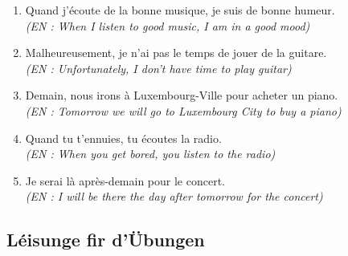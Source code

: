 \begin{enumerate}
    \item Quand j'écoute de la bonne musique, je suis de bonne humeur. \\
    \small\textit{(EN : When I listen to good music, I am in a good mood)}
    \item Malheureusement, je n'ai pas le temps de jouer de la guitare. \\
    \small\textit{(EN : Unfortunately, I don't have time to play guitar)}
    \item Demain, nous irons à Luxembourg-Ville pour acheter un piano. \\
    \small\textit{(EN : Tomorrow we will go to Luxembourg City to buy a piano)}
    \item Quand tu t'ennuies, tu écoutes la radio. \\
    \small\textit{(EN : When you get bored, you listen to the radio)}
    \item Je serai là après-demain pour le concert. \\
    \small\textit{(EN : I will be there the day after tomorrow for the concert)}
\end{enumerate}

\vspace{1em}

\subsection*{Léisunge fir d'Übungen}

